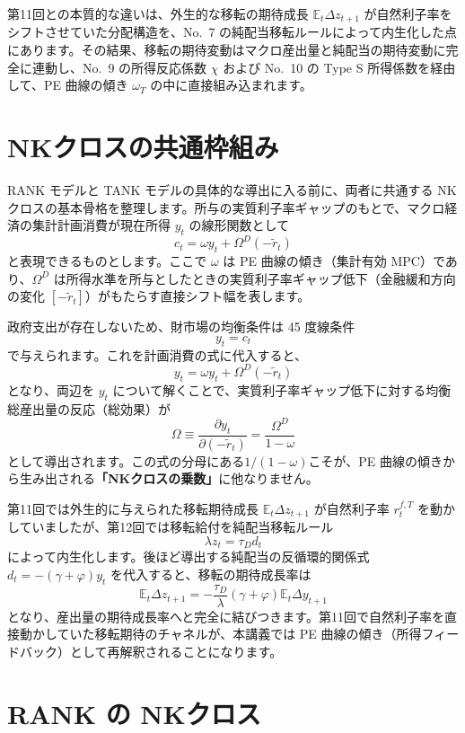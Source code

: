 \documentclass[
  japanese,
  lualatex,
  ja=standard,
  12pt,
  a4paper]{ltjsarticle}
\begin{document}
第11回との本質的な違いは、外生的な移転の期待成長
\(\mathbb{E}_t \Delta z_{t+1}\)
が自然利子率をシフトさせていた分配構造を、No.~7
の純配当移転ルールによって内生化した点にあります。その結果、移転の期待変動はマクロ産出量と純配当の期待変動に完全に連動し、No.~9
の所得反応係数 \(\chi\) および No.~10 の Type S 所得係数を経由して、PE
曲線の傾き \(\omega_T\) の中に直接組み込まれます。


\section{NKクロスの共通枠組み}\label{nkux30afux30edux30b9ux306eux5171ux901aux67a0ux7d44ux307f}

RANK モデルと TANK モデルの具体的な導出に入る前に、両者に共通する
NKクロスの基本骨格を整理します。所与の実質利子率ギャップのもとで、マクロ経済の集計計画消費が現在所得
\(y_t\) の線形関数として \[
c_t = \omega y_t + \Omega^D(-\widetilde{r}_t)
\] と表現できるものとします。ここで \(\omega\) は PE
曲線の傾き（集計有効 MPC）であり、\(\Omega^D\)
は所得水準を所与としたときの実質利子率ギャップ低下（金融緩和方向の変化
\([-\widetilde{r}_t]\)）がもたらす直接シフト幅を表します。

政府支出が存在しないため、財市場の均衡条件は 45 度線条件 \[
y_t = c_t
\] で与えられます。これを計画消費の式に代入すると、 \[
y_t = \omega y_t + \Omega^D(-\widetilde{r}_t)
\] となり、両辺を \(y_t\)
について解くことで、実質利子率ギャップ低下に対する均衡総産出量の反応（総効果）が
\[
\Omega \equiv \frac{\partial y_t}{\partial(-\widetilde{r}_t)} = \frac{\Omega^D}{1-\omega}
\]
として導出されます。この式の分母にある\textbf{\(1/(1-\omega)\)}こそが、PE
曲線の傾きから生み出される\textbf{「NKクロスの乗数」}に他なりません。

第11回では外生的に与えられた移転期待成長 \(\mathbb{E}_t \Delta z_{t+1}\)
が自然利子率 \(r_t^{f,T}\)
を動かしていましたが、第12回では移転給付を純配当移転ルール \[
\lambda z_t = \tau_D d_t
\] によって内生化します。後ほど導出する純配当の反循環的関係式
\(d_t = -(\gamma+\varphi)y_t\) を代入すると、移転の期待成長率は \[
\mathbb{E}_t \Delta z_{t+1} = -\frac{\tau_D}{\lambda}(\gamma+\varphi) \mathbb{E}_t \Delta y_{t+1}
\]
となり、産出量の期待成長率へと完全に結びつきます。第11回で自然利子率を直接動かしていた移転期待のチャネルが、本講義では
PE 曲線の傾き（所得フィードバック）として再解釈されることになります。


\section{RANK の NKクロス}\label{rank-ux306e-nkux30afux30edux30b9}
\end{document}
